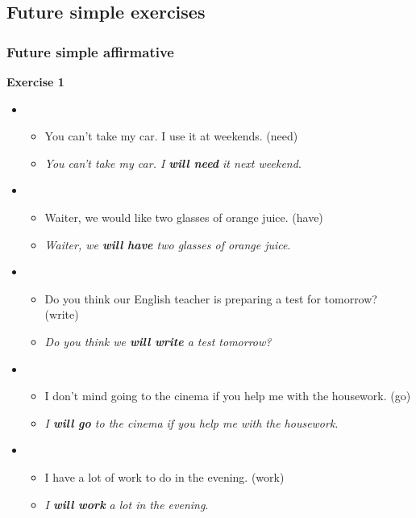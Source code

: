 \subsection{Future simple exercises}

\subsubsection{Future simple affirmative}

\textbf{Exercise 1}

\begin{itemize}

\item
\begin{itemize}
\item You can't take my car. I use it at weekends. (need)
\item \textit{You can't take my car. I \textbf{will need} it next weekend}.
\end{itemize}

\item
\begin{itemize}
\item Waiter, we would like two glasses of orange juice. (have)
\item \textit{Waiter, we \textbf{will have} two glasses of orange juice}.
\end{itemize}

\item
\begin{itemize}
\item Do you think our English teacher is preparing a test for tomorrow? (write)
\item \textit{Do you think we \textbf{will write} a test tomorrow?}
\end{itemize}

\item
\begin{itemize}
\item I don't mind going to the cinema if you help me with the housework. (go)
\item \textit{I \textbf{will go} to the cinema if you help me with the housework}.
\end{itemize}

\item
\begin{itemize}
\item I have a lot of work to do in the evening. (work)
\item \textit{I \textbf{will work} a lot in the evening}.
\end{itemize}


\end{itemize}

